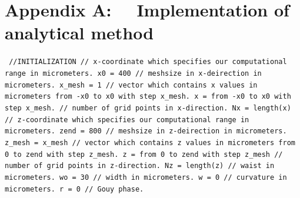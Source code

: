 \documentclass[a4paper]{article}
\begin{document}
	\section*{Appendix A: ~~Implementation of analytical method}
	\texttt{\noindent
		\textcolor{OliveGreen}{//INITIALIZATION\newline\newline
			// x-coordinate which specifies our computational range in micrometers}.\newline
		x0 = 400 \newline
		\textcolor{OliveGreen}{// meshsize in x-deirection in micrometers.}\newline
		x\_mesh = 1 \newline
		\textcolor{OliveGreen}{// vector which contains x values in micrometers from -x0 to x0 with step x\_mesh.}\newline
		x = from -x0 to x0 with step x\_mesh.\newline
		\textcolor{OliveGreen}{// number of grid points in x-direction.}\newline
		Nx = length(x)\newline
		\textcolor{OliveGreen}{// z-coordinate which specifies our computational range in micrometers.}\newline
		zend = 800 \newline
		\textcolor{OliveGreen}{// meshsize in z-deirection in micrometers.}\newline
		z\_mesh = x\_mesh \newline
		\textcolor{OliveGreen}{// vector which contains z values in micrometers from 0 to zend with step z\_mesh.}\newline
		z = from 0 to zend with step z\_mesh\newline
		\textcolor{OliveGreen}{// number of grid points in z-direction.}\newline
		Nz = length(z)\newline
		\textcolor{OliveGreen}{// waist in micrometers.}\newline
		wo = 30 \newline
		\textcolor{OliveGreen}{// width in micrometers.}\newline
		w = 0 \newline
		\textcolor{OliveGreen}{// curvature in micrometers.}\newline
		r = 0 \newline
		\textcolor{OliveGreen}{// Gouy phase.}\newline
}
\end{document}
